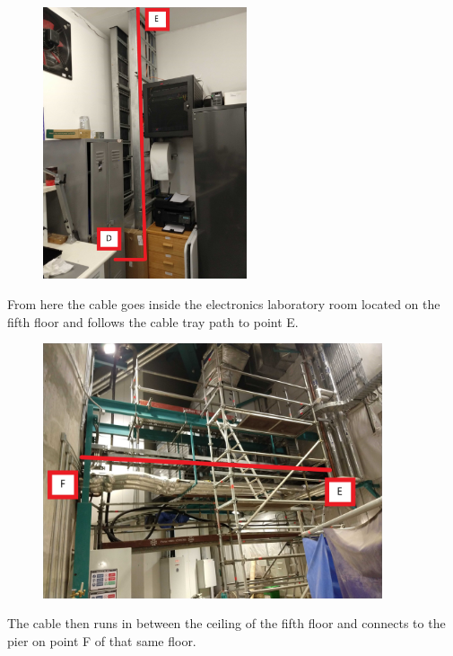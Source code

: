   
\newpage

\begin{figure}
  \centering
  \includegraphics[width=6cm]{images/17.jpg}
\end{figure}

From here the cable goes inside the electronics laboratory room located on the fifth floor and follows the cable tray path to point E.

\begin{figure}
  \centering
  \includegraphics[width=10cm]{images/18.jpg}
\end{figure}

The cable then runs in between the ceiling of the fifth floor and connects to the pier on point F of that same floor.

